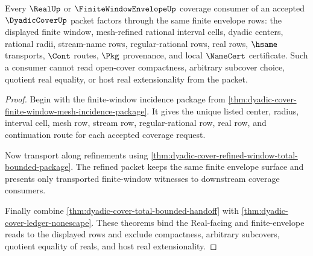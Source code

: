 \begin{theorem}
\label{thm:dyadic-cover-real-envelope-coverage-exactness}
Every $\RealUp$ or $\FiniteWindowEnvelopeUp$ coverage consumer of an accepted
$\DyadicCoverUp$ packet factors through the same finite envelope rows: the
displayed finite window, mesh-refined rational interval cells, dyadic centers,
rational radii, stream-name rows, regular-rational rows, real rows,
$\hsame$ transports, $\Cont$ routes, $\Pkg$ provenance, and local
$\NameCert$ certificate. Such a consumer cannot read open-cover compactness,
arbitrary subcover choice, quotient real equality, or host real extensionality
from the packet.
\end{theorem}
\begin{proof}
Begin with the finite-window incidence package from
\autoref{thm:dyadic-cover-finite-window-mesh-incidence-package}. It gives the
unique listed center, radius, interval cell, mesh row, stream row,
regular-rational row, real row, and continuation route for each accepted
coverage request.

Now transport along refinements using
\autoref{thm:dyadic-cover-refined-window-total-bounded-package}. The refined
packet keeps the same finite envelope surface and presents only transported
finite-window witnesses to downstream coverage consumers.

Finally combine \autoref{thm:dyadic-cover-total-bounded-handoff} with
\autoref{thm:dyadic-cover-ledger-nonescape}. These theorems bind the
Real-facing and finite-envelope reads to the displayed rows and exclude
compactness, arbitrary subcovers, quotient equality of reals, and host real
extensionality.
\end{proof}

